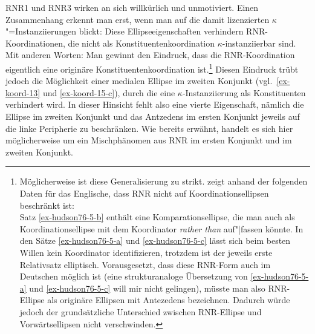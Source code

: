 RNR1 und RNR3 wirken an sich willkürlich und unmotiviert. Einen Zusammenhang erkennt man erst, wenn man auf die damit lizenzierten $\kappa$"=Instanziierungen blickt: Diese Ellipseeigenschaften verhindern RNR-Koordinationen, die nicht als Konstituentenkoordination $\kappa$-instanziierbar sind. Mit anderen Worten: Man gewinnt den Eindruck, dass die RNR-Koordina\-tion eigentlich eine originäre Konstituentenkoordination ist.\footnote{Möglicherweise ist diese Generalisierung zu strikt. \cite{Hudson:76} zeigt anhand der folgenden Daten für das Englische, dass RNR nicht auf Koordinationsellipsen beschränkt ist:\\
Satz \ref{ex-hudson76-5-b} enthält eine Komparationsellipse, die man auch als Koordinationsellipse mit dem Koordinator {\it rather than} auf"|fassen könnte. In den Sätze \ref{ex-hudson76-5-a} und \ref{ex-hudson76-5-c} lässt sich beim besten Willen kein Koordinator identifizieren, trotzdem ist der jeweils erste Relativsatz elliptisch. Vorausgesetzt, dass diese RNR-Form auch im Deutschen möglich ist (eine strukturanaloge Übersetzung von \ref{ex-hudson76-5-a} und \ref{ex-hudson76-5-c} will mir nicht gelingen), müsste man also RNR-Ellipse als originäre Ellipsen mit Antezedens bezeichnen. Dadurch würde jedoch der grundsätzliche Unterschied zwischen RNR-Ellipse und Vorwärtsellipsen nicht verschwinden.} Diesen Eindruck trübt jedoch die Möglichkeit einer medialen Ellipse im zweiten Konjunkt (vgl.\ \ref{ex-koord-13} und \ref{ex-koord-15-c}), durch die eine $\kappa$-Instanziierung als Konstituenten verhindert wird. In dieser Hinsicht fehlt also eine vierte Eigenschaft, nämlich die Ellipse im zweiten Konjunkt und das Antzedens im ersten Konjunkt jeweils auf die linke Peripherie zu beschränken. Wie bereits erwähnt, handelt es sich hier möglicherweise um ein Mischphänomen aus RNR im ersten Konjunkt und  im zweiten Konjunkt.



